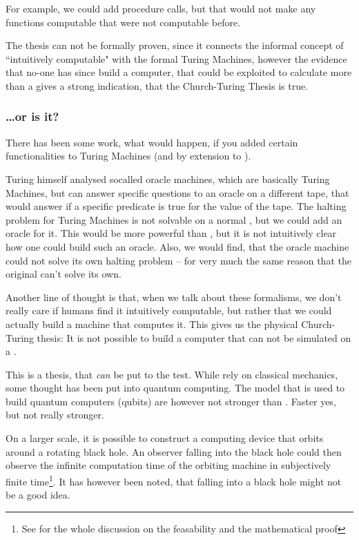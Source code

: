For example, we could add procedure calls, but that would not make any 
functions computable that were not computable before.

The thesis can not be formally proven, since it connects the informal concept 
of ``intuitively computable" with the formal Turing Machines, however the 
evidence that no-one has since build a computer, that could be exploited to
calculate more than a \TM gives a strong indication, that the Church-Turing
Thesis is true.

\subsubsection{\dots or is it?}
There has been some work, what would happen, if you added certain 
functionalities to Turing Machines (and by extension to \WHILE). 

Turing himself analysed socalled oracle machines, which are basically Turing 
Machines, but can answer specific questions to an oracle on a different tape, 
that would answer if a specific predicate is true for the value of the tape.
The halting problem for Turing Machines is not solvable on a normal \TM, but 
we could add an oracle for it. This would be more powerful than \TM, but it 
is not intuitively clear how one could build such an oracle. Also, we would 
find, that the oracle machine could not solve its own halting problem -- for 
very much the same reason that the original \TM can't solve its own.

Another line of thought is that, when we talk about these formalisms, we 
don't really care if humans find it intuitively computable, but rather that 
we could actually build a machine that computes it. This gives us the 
physical Church-Turing thesis: It is not possible to build a computer that 
can not be simulated on a \TM.

This is a thesis, that {\em can} be put to the test. While \TM rely on 
classical mechanics, some thought has been put into quantum computing. The 
model that is used to build quantum computers (qubits) are however not 
stronger than \TM. Faster yes, but not really stronger.

On a larger scale, it is possible to construct a computing device that orbits 
around a rotating black hole. An observer falling into the black hole could 
then observe the infinite computation time of the orbiting machine in
subjectively finite time\footnote{See \cite{etesi2002blackhole} for the whole
discussion on the feasability and the mathematical proof}. It has however been
noted, that falling into a black hole might not be a good idea\citationneeded.


